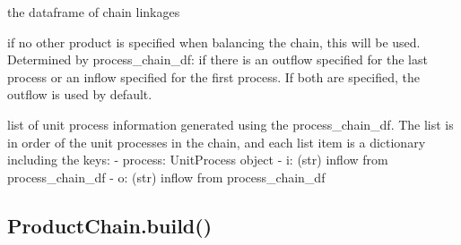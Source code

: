 \documentclass[a4paper,10pt,english]{sphinxmanual}
\begin{document}
\begin{fulllineitems}
\begin{fulllineitems}
\end{fulllineitems}


\begin{fulllineitems}
\label{\detokenize{chain:processchain.ProductChain.process_chain_df}}
the dataframe of chain linkages

\end{fulllineitems}


\begin{fulllineitems}
\label{\detokenize{chain:processchain.ProductChain.default_product}}
if no other product is specified when balancing
the chain, this will be used. Determined by process\_chain\_df:
if there is an outflow specified for the last process or an
inflow specified for the first process. If both are specified,
the outflow is used by default.

\end{fulllineitems}


\begin{fulllineitems}
\label{\detokenize{chain:processchain.ProductChain.process_list}}
list of unit process information generated using the
process\_chain\_df.  The list is in order of the unit processes in
the chain, and each list item is a dictionary including the keys:
- process: UnitProcess object
- i: (str) inflow from process\_chain\_df
- o: (str) inflow from process\_chain\_df

\end{fulllineitems}


\end{fulllineitems}



\subsection{ProductChain.build()}
\label{\detokenize{chain:productchain-build}}
\end{document}

